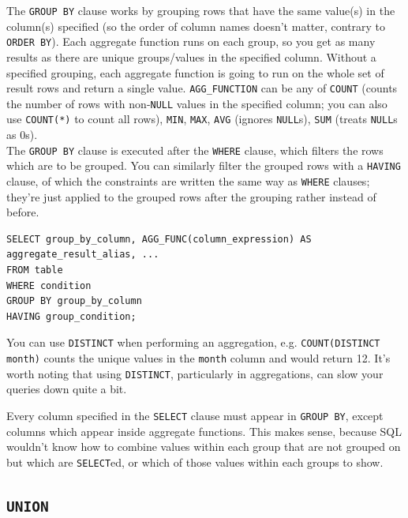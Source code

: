 \documentclass[table, xcdraw]{article}%
\begin{document}
The \texttt{GROUP BY} clause works by grouping rows that have the same value(s) in the column(s) specified (so the order of column names doesn't matter, contrary to \texttt{ORDER BY}). Each aggregate function runs on each group, so you get as many results as there are unique groups/values in the specified column. Without a specified grouping, each aggregate function is going to run on the whole set of result rows and return a single value. \texttt{AGG_FUNCTION} can be any of \texttt{COUNT} (counts the number of rows with non-\texttt{NULL} values in the specified column; you can also use \texttt{COUNT(*)} to count all rows), \texttt{MIN}, \texttt{MAX}, \texttt{AVG} (ignores \texttt{NULL}s), \texttt{SUM} (treats \texttt{NULL}s as 0s).\\
The \texttt{GROUP BY} clause is executed after the \texttt{WHERE} clause, which filters the rows which are to be grouped. You can similarly filter the grouped rows with a \texttt{HAVING} clause, of which the constraints are written the same way as \texttt{WHERE} clauses; they're just applied to the grouped rows after the grouping rather instead of before.

\begin{verbatim}
SELECT group_by_column, AGG_FUNC(column_expression) AS aggregate_result_alias, ...
FROM table
WHERE condition
GROUP BY group_by_column
HAVING group_condition;
\end{verbatim}

You can use \texttt{DISTINCT} when performing an aggregation, e.g. \texttt{COUNT(DISTINCT month)} counts the unique values in the \texttt{month} column and would return 12. It's worth noting that using \texttt{DISTINCT}, particularly in aggregations, can slow your queries down quite a bit.

Every column specified in the \texttt{SELECT} clause must appear in \texttt{GROUP BY}, except columns which appear inside aggregate functions. This makes sense, because SQL wouldn't know how to combine values within each group that are not grouped on but which are \texttt{SELECT}ed, or which of those values within each groups to show.

\subsection{\texttt{UNION}}
\end{document}
